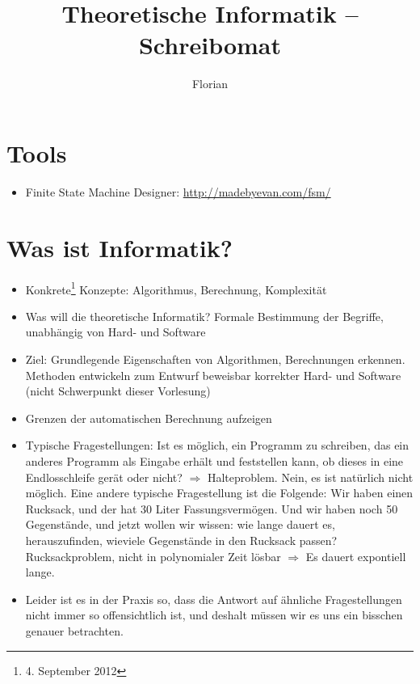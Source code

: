 \documentclass[11pt]{article} %
\title{Theoretische Informatik -- Schreibomat}
\author{Florian}
\theoremstyle{definition}
\begin{document}
\maketitle

\section*{Tools}
\begin{itemize}
\item Finite State Machine Designer: \url{http://madebyevan.com/fsm/}
\end{itemize}

\section{Was ist Informatik?}

\begin{itemize}

\item Konkrete\footnote{4. September 2012} Konzepte: Algorithmus, Berechnung, Komplexität

\item Was will die theoretische Informatik? Formale Bestimmung der Begriffe, unabhängig von Hard- und Software

\item Ziel: Grundlegende Eigenschaften von Algorithmen, Berechnungen erkennen. Methoden entwickeln zum Entwurf beweisbar korrekter Hard- und Software (nicht Schwerpunkt dieser Vorlesung)

\item Grenzen der automatischen Berechnung aufzeigen

\item Typische Fragestellungen: Ist es möglich, ein Programm zu schreiben, das ein anderes Programm als Eingabe erhält und feststellen kann, ob dieses in eine Endlosschleife gerät oder nicht? $\Rightarrow$ Halteproblem. Nein, es ist natürlich nicht möglich. Eine andere typische Fragestellung ist die Folgende: Wir haben einen Rucksack, und der hat 30 Liter Fassungsvermögen. Und wir haben noch 50 Gegenstände, und jetzt wollen wir wissen: wie lange dauert es, herauszufinden, wieviele Gegenstände in den Rucksack passen? Rucksackproblem, nicht in polynomialer Zeit lösbar $\Rightarrow$ Es dauert expontiell lange.

\item Leider ist es in der Praxis so, dass die Antwort auf ähnliche Fragestellungen nicht immer so offensichtlich ist, und deshalt müssen wir es uns ein bisschen genauer betrachten.

\end{itemize}
\end{document}
